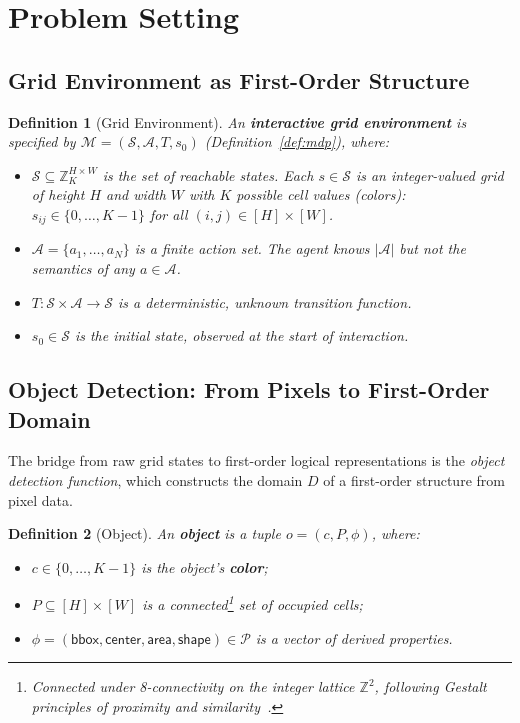 \documentclass{article}
\newtheorem{definition}{Definition}
\newcommand{\calS}{\mathcal{S}}
\newcommand{\calA}{\mathcal{A}}
\newcommand{\calM}{\mathcal{M}}
\newcommand{\calP}{\mathcal{P}}
\newcommand{\bbZ}{\mathbb{Z}}
\begin{document}
\section{Problem Setting}
\label{sec:problem}

\subsection{Grid Environment as First-Order Structure}
\label{sec:grid_env}

\begin{definition}[Grid Environment]
\label{def:grid_env}
An \textbf{interactive grid environment} is specified by $\calM = (\calS, \calA, T, s_0)$ (Definition~\ref{def:mdp}), where:
\begin{itemize}[nosep]
    \item $\calS \subseteq \bbZ_K^{H \times W}$ is the set of reachable states.  Each $s \in \calS$ is an integer-valued grid of height $H$ and width $W$ with $K$ possible cell values (colors): $s_{ij} \in \{0, \ldots, K-1\}$ for all $(i,j) \in [H] \times [W]$.
    \item $\calA = \{a_1, \ldots, a_N\}$ is a finite action set.  The agent knows $|\calA|$ but not the semantics of any $a \in \calA$.
    \item $T : \calS \times \calA \to \calS$ is a deterministic, unknown transition function.
    \item $s_0 \in \calS$ is the initial state, observed at the start of interaction.
\end{itemize}
\end{definition}

\subsection{Object Detection: From Pixels to First-Order Domain}
\label{sec:object_detection}

The bridge from raw grid states to first-order logical representations is the \emph{object detection function}, which constructs the domain $D$ of a first-order structure from pixel data.

\begin{definition}[Object]
\label{def:object}
An \textbf{object} is a tuple $o = (c, P, \phi)$, where:
\begin{itemize}[nosep]
    \item $c \in \{0, \ldots, K-1\}$ is the object's \textbf{color};
    \item $P \subseteq [H] \times [W]$ is a connected\footnote{Connected under 8-connectivity on the integer lattice $\bbZ^2$, following Gestalt principles of proximity and similarity~\cite{wertheimer1938laws}.} set of occupied cells;
    \item $\phi = (\mathsf{bbox}, \mathsf{center}, \mathsf{area}, \mathsf{shape}) \in \calP$ is a vector of derived properties.
\end{itemize}
\end{definition}
\end{document}
